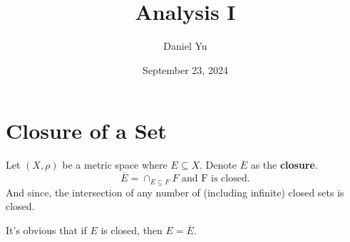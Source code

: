 \documentclass[a4paper]{article}
\title{\Huge{Analysis I}}
\author{\huge{Daniel Yu}}
\date{September 23, 2024}
\begin{document}
\maketitle
\newpage%
\tableofcontents
\pagebreak
  
\section{Closure of a Set}
\begin{definition}
  Let $(X, \rho)$ be a metric space where  $E \subseteq X$. Denote $\overline{E}$ as the \textbf{closure}.
  \[
    \overline{E} = \cap_{E \subseteq F} F \text{ and F is closed}
  .\]
  And since, the intersection of any number of (including infinite) closed sets is closed. 
\end{definition}
\begin{note}
  It's obvious that if $E$ is closed, then  $E = \overline{E}$.
\end{note}
\end{document}
